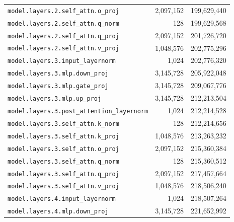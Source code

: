 \documentclass[10pt,a4paper]{article}
\theoremstyle{definition}
\begin{document}
\begin{appendices}
\begin{longtable}{p{9.5cm}rr}
\texttt{model.\allowbreak{}layers.\allowbreak{}2.\allowbreak{}self\_attn.\allowbreak{}o\_proj} & 2,097,152 & 199,629,440 \\
\texttt{model.\allowbreak{}layers.\allowbreak{}2.\allowbreak{}self\_attn.\allowbreak{}q\_norm} & 128 & 199,629,568 \\
\texttt{model.\allowbreak{}layers.\allowbreak{}2.\allowbreak{}self\_attn.\allowbreak{}q\_proj} & 2,097,152 & 201,726,720 \\
\texttt{model.\allowbreak{}layers.\allowbreak{}2.\allowbreak{}self\_attn.\allowbreak{}v\_proj} & 1,048,576 & 202,775,296 \\
\texttt{model.\allowbreak{}layers.\allowbreak{}3.\allowbreak{}input\_layernorm} & 1,024 & 202,776,320 \\
\texttt{model.\allowbreak{}layers.\allowbreak{}3.\allowbreak{}mlp.\allowbreak{}down\_proj} & 3,145,728 & 205,922,048 \\
\texttt{model.\allowbreak{}layers.\allowbreak{}3.\allowbreak{}mlp.\allowbreak{}gate\_proj} & 3,145,728 & 209,067,776 \\
\texttt{model.\allowbreak{}layers.\allowbreak{}3.\allowbreak{}mlp.\allowbreak{}up\_proj} & 3,145,728 & 212,213,504 \\
\texttt{model.\allowbreak{}layers.\allowbreak{}3.\allowbreak{}post\_attention\_layernorm} & 1,024 & 212,214,528 \\
\texttt{model.\allowbreak{}layers.\allowbreak{}3.\allowbreak{}self\_attn.\allowbreak{}k\_norm} & 128 & 212,214,656 \\
\texttt{model.\allowbreak{}layers.\allowbreak{}3.\allowbreak{}self\_attn.\allowbreak{}k\_proj} & 1,048,576 & 213,263,232 \\
\texttt{model.\allowbreak{}layers.\allowbreak{}3.\allowbreak{}self\_attn.\allowbreak{}o\_proj} & 2,097,152 & 215,360,384 \\
\texttt{model.\allowbreak{}layers.\allowbreak{}3.\allowbreak{}self\_attn.\allowbreak{}q\_norm} & 128 & 215,360,512 \\
\texttt{model.\allowbreak{}layers.\allowbreak{}3.\allowbreak{}self\_attn.\allowbreak{}q\_proj} & 2,097,152 & 217,457,664 \\
\texttt{model.\allowbreak{}layers.\allowbreak{}3.\allowbreak{}self\_attn.\allowbreak{}v\_proj} & 1,048,576 & 218,506,240 \\
\texttt{model.\allowbreak{}layers.\allowbreak{}4.\allowbreak{}input\_layernorm} & 1,024 & 218,507,264 \\
\texttt{model.\allowbreak{}layers.\allowbreak{}4.\allowbreak{}mlp.\allowbreak{}down\_proj} & 3,145,728 & 221,652,992 \\

\end{longtable}
\end{appendices}
\end{document}
